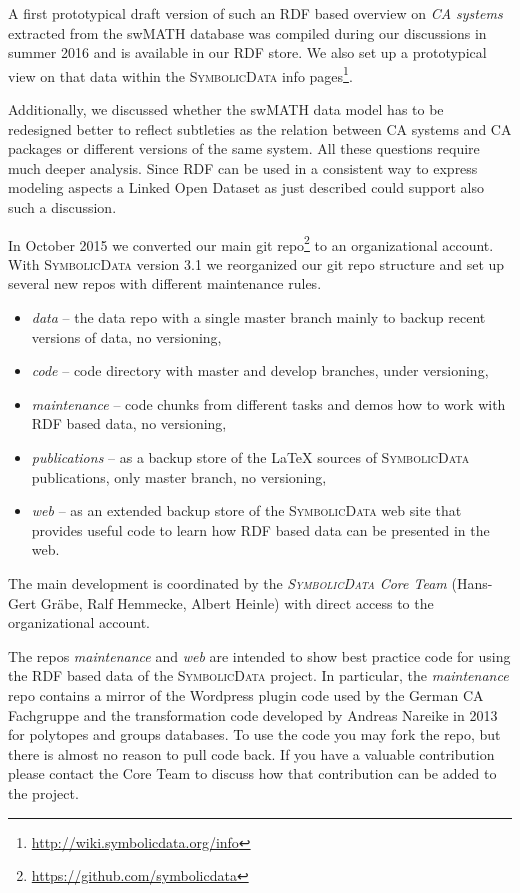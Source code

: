\documentclass[a4paper,11pt]{article}
\def\SD{\textsc{Symbolic\-Data}}
\begin{document}
\begin{multicols}{2}
A first prototypical draft version of such an RDF based overview on \emph{CA
  systems} extracted from the swMATH database was compiled during our
discussions in summer 2016 and is available in our RDF store.  We also set up a
prototypical view on that data within the {\SD} info pages\footnote{
  \url{http://wiki.symbolicdata.org/info}}.

Additionally, we discussed whether the swMATH data model has to be redesigned
better to reflect subtleties as the relation between CA systems and CA
packages or different versions of the same system.  All these questions
require much deeper analysis.  Since RDF can be used in a consistent way to
express modeling aspects a Linked Open Dataset as just described could support
also such a discussion.

\Ueberschrift{Advances in the {\SD} Infrastructure}{ai}

In October 2015 we converted our main git repo\footnote{
  \url{https://github.com/symbolicdata}} to an organizational account. With
{\SD} version 3.1 we reorganized our git repo structure and set up several new
repos with different maintenance rules.
\begin{itemize}
\item \emph{data} -- the data repo with a single master branch mainly to backup
  recent versions of data, no versioning,
\item \emph{code} -- code directory with master and develop branches, under
  versioning,
\item \emph{maintenance} -- code chunks from different tasks and demos how to
  work with RDF based data, no versioning,
\item \emph{publications} -- as a backup store of the {\LaTeX} sources of {\SD}
  publications, only master branch, no versioning,
\item \emph{web} -- as an extended backup store of the {\SD} web site that
  provides useful code to learn how RDF based data can be presented in the
  web.
\end{itemize}

The main development is coordinated by the \emph{{\SD} Core Team} (Hans-Gert
Gr\"abe, Ralf Hemmecke, Albert Heinle) with direct access to the
organizational account.

The repos \emph{maintenance} and \emph{web} are intended to show best practice
code for using the RDF based data of the {\SD} project.  In particular, the
\emph{maintenance} repo contains a mirror of the Wordpress plugin code used by
the German CA Fachgruppe and the transformation code developed by Andreas
Nareike in 2013 for polytopes and groups databases.  To use the code you may
fork the repo, but there is almost no reason to pull code back. If you have a
valuable contribution please contact the Core Team to discuss how that
contribution can be added to the project.


\end{multicols}
\end{document}
